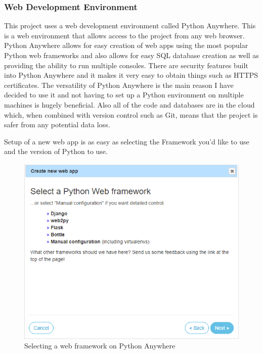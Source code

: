 \documentclass[10pt,a4paper]{article}
\begin{document}
\subsubsection{Web Development Environment}
This project uses a web development environment called Python Anywhere. This is a web environment that allows access to the project from any web browser. Python Anywhere allows for easy creation of web apps using the most popular Python web frameworks and also allows for easy SQL database creation as well as providing the ability to run multiple consoles. There are security features built into Python Anywhere and it makes it very easy to obtain things such as HTTPS certificates. The versatility of Python Anywhere is the main reason I have decided to use it and not having to set up a Python environment on multiple machines is hugely beneficial. Also all of the code and databases are in the cloud which, when combined with version control such as Git, means that the project is safer from any potential data loss.

Setup of a new web app is as easy as selecting the Framework you'd like to use and the version of Python to use.

\begin{figure}[H]
\centering
  \includegraphics[width=\linewidth]{images/webappframework.png}
  \caption{Selecting a web framework on Python Anywhere}
  \label{fig:webappframework}
\end{figure}
\end{document}
